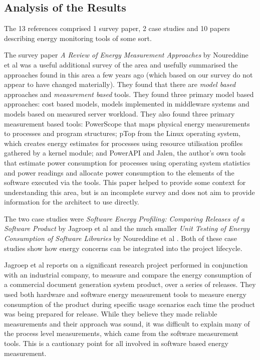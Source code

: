 \subsection{Analysis of the Results}

The 13 references comprised 1 survey paper, 2 case studies and 10 papers describing energy monitoring tools of some sort.

The survey paper \emph{A Review of Energy Measurement Approaches} by Noureddine et al \cite{noureddine2013-energyreview} was a useful additional survey of the area and usefully summarised the approaches found in this area a few years ago (which based on our survey do not appear to have changed materially).  They found that there are \emph{model based}  approaches and \emph{measurement based} tools.  They found three primary model based approaches: cost based models, models implemented in middleware systems and models based on measured server workload.  They also found three primary measurement based tools: PowerScope that maps physical energy measurements to processes and program structures; pTop from the Linux operating system, which  
creates energy estimates for processes using resource utilisation profiles gathered by a kernel module; and PowerAPI and Jalen, the author's own tools that estimate power consumption for processes using operating system statistics and power readings and allocate power consumption to the elements of the software executed via the tools.  This paper helped to provide some context for understanding this area, but is an incomplete survey and does not aim to provide information for the architect to use directly.

The two case studies were \emph{Software Energy Profiling: Comparing Releases of a Software Product} by Jagroep et al \cite{jagroep2016-comparingreleases} and the much smaller \emph{Unit Testing of Energy Consumption of Software Libraries} by Noureddine et al \cite{noureddine2014-energyutest}.  Both of these case studies show how energy concerns can be integrated into the project lifecycle.

Jagroep et al reports on a significant research project performed in conjunction with an industrial company, to measure and compare the energy consumption of a commercial document generation system product, over a series of releases.  They used both hardware and software energy measurement tools to measure energy consumption of the product during specific usage scenarios each time the product was being prepared for release.  While they believe they made reliable measurements and their approach was sound, it was difficult to explain many of the process level measurements, which came from the software measurement tools.  This is a cautionary point for all involved in software based energy measurement.

